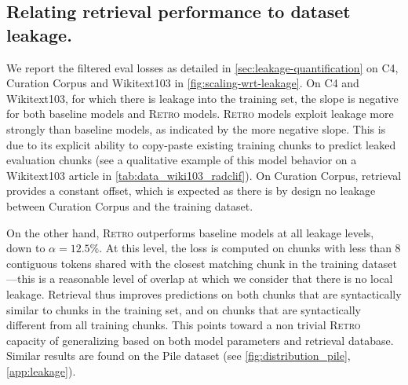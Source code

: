 \documentclass[11pt, a4paper, logo]{deepmind}
\newcommand{\retro}{\textsc{Retro}\xspace}
\begin{document}
\subsection{Relating retrieval performance to dataset leakage.}
\label{subsec-analysis-train-valid-leak}

We report the filtered eval losses as detailed in \autoref{sec:leakage-quantification} on C4, Curation Corpus and Wikitext103 in \autoref{fig:scaling-wrt-leakage}. On C4 and Wikitext103, for which there is leakage into the training set, the slope is negative for both baseline models and \retro models. \retro models exploit leakage more strongly than baseline models, as indicated by the more negative slope. This is due to its explicit ability to copy-paste existing training chunks to predict leaked evaluation chunks (see a qualitative example of this model behavior on a Wikitext103 article in \autoref{tab:data_wiki103_radclif}). On Curation Corpus, retrieval provides a constant offset, which is expected as there is by design no leakage between Curation Corpus and the training dataset.

On the other hand, \retro outperforms baseline models at all leakage levels, down to $\alpha = 12.5\%$. At this level, the loss is computed on chunks with less than $8$ contiguous tokens shared with the closest matching chunk in the training dataset---this is a reasonable level of overlap at which we consider that there is no local leakage. Retrieval thus improves predictions on both chunks that are syntactically similar to chunks in the training set, and on chunks that are syntactically different from all training chunks. This points toward a non trivial \retro capacity of generalizing based on both model parameters and retrieval database. Similar results are found on the Pile dataset (see \autoref{fig:distribution_pile}, \autoref{app:leakage}).
\end{document}
